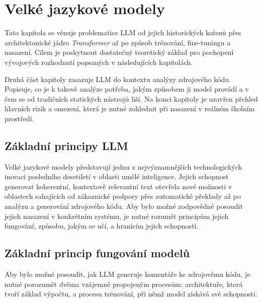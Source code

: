 \chapter{Velké jazykové modely}
\label{ch:llm}

Tato kapitola se věnuje problematice LLM od jejich historických kořenů přes architektonické jádro \textit{Transformer} až po způsob trénování, fine-tuningu a nasazení.
Cílem je poskytnout dostatečný teoretický základ pro pochopení vývojových rozhodnutí popsaných v následujících kapitolách.

Druhá část kapitoly zasazuje LLM do kontextu analýzy zdrojového kódu.
Popisuje, co je k takové analýze potřeba, jakým způsobem ji model provádí a v čem se od tradičních statických nástrojů liší.
Na konci kapitoly je uzavřen přehled hlavních rizik a omezení, která je nutné zohlednit při nasazení v reálném školním prostředí.

\section{Základní principy LLM}
\label{sec:llm-principles}

Velké jazykové modely představují jednu z nejvýznamnějších technologických inovací posledního desetiletí v oblasti umělé inteligence.
Jejich schopnost generovat koherentní, kontextově relevantní text otevřela nové možnosti v oblastech sahajících od zákaznické podpory přes automatické překlady až po analýzu a generování zdrojového kódu.
Aby bylo možné zodpovědně posoudit jejich nasazení v konkrétním systému, je nutné rozumět principům jejich fungování, způsobu, jakým se učí, a hranicím jejich schopností.





\section{Základní princip fungování modelů}
\label{sec:llm-functioning}

Aby bylo možné posoudit, jak LLM generuje komentáře ke zdrojovému kódu, je nutné porozumět dvěma vzájemně propojeným procesům: architektuře, která tvoří základ výpočtu, a procesu trénování, při němž model získává své schopnosti.

